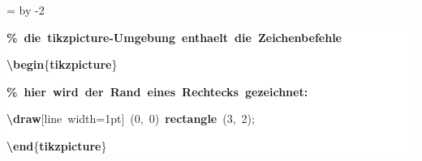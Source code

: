 \begingroup
\ttfamily
{}
=\textwidth
\advance{} by -2\fboxsep
\noindent
\colorbox{background}
{%
\parbox{\dimen255}
{%
\rule[-0.5ex]{0pt}{2.5ex}\hspace*{0.0em}\textcolor{G}{\textbf{\%~die~tikzpicture{-}Umgebung~enthaelt~die~Zeichenbefehle}}\\
\rule[-0.5ex]{0pt}{2.5ex}\hspace*{0.0em}\textcolor{R}{\textbf{\textbackslash{}begin}}\{\textcolor{R}{\textbf{tikzpicture}}\}\\
\rule[-0.5ex]{0pt}{2.5ex}\hspace*{1.0em}\textcolor{G}{\textbf{\%~hier~wird~der~Rand~eines~Rechtecks~gezeichnet:}}\\
\rule[-0.5ex]{0pt}{2.5ex}\hspace*{1.0em}\textcolor{R}{\textbf{\textbackslash{}draw}}[line~width=1pt]~(0,~0)~\textcolor{R}{\textbf{rectangle}}~(3,~2);\\
\rule[-0.5ex]{0pt}{2.5ex}\hspace*{0.0em}\textcolor{R}{\textbf{\textbackslash{}end}}\{\textcolor{R}{\textbf{tikzpicture}}\}}%
}%
\endgroup
